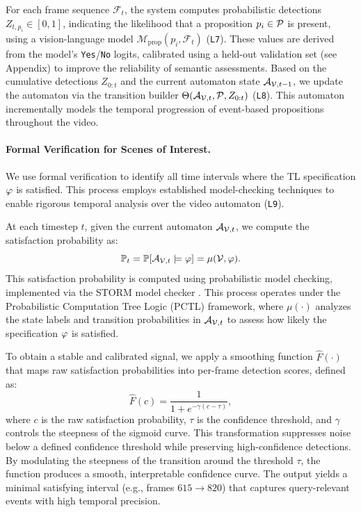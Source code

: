 \documentclass[letterpaper]{article} %
\begin{document}
    For each frame sequence $\mathcal{F}_t$, the system computes probabilistic detections $Z_{t, p_i} \in [0, 1]$, indicating the likelihood that a proposition $p_i \in \mathcal{P}$ is present, using a vision-language model $\mathcal{M}_{\text{prop}}(p_i, \mathcal{F}_t)$ (\texttt{L7}). These values are derived from the model’s \texttt{Yes}/\texttt{No} logits, calibrated using a held-out validation set (see Appendix) to improve the reliability of semantic assessments. Based on the cumulative detections $Z_{0:t}$ and the current automaton state $\mathcal{A}_{\mathcal{V},t-1}$, we update the automaton via the transition builder $\Theta(\mathcal{A}_{\mathcal{V},t}, \mathcal{P}, Z_{0:t})$ (\texttt{L8}). This automaton incrementally models the temporal progression of event-based propositions throughout the video.
    
    \paragraph{Formal Verification for Scenes of Interest.}
    We use formal verification to identify all time intervals where the TL specification $\varphi$ is satisfied. This process employs established model-checking techniques to enable rigorous temporal analysis over the video automaton (\texttt{L9}).
    
    At each timestep $t$, given the current automaton $\mathcal{A}_{\mathcal{V},t}$, we compute the satisfaction probability as:
    \begin{equation}
    \mathbb{P}_t = \mathbb{P}[\mathcal{A}_{\mathcal{V},t} \models \varphi] = \mu(\mathcal{V}, \varphi).
    \end{equation}
    This satisfaction probability is computed using probabilistic model checking, implemented via the STORM model checker \citep{storm,stormpy}. This process operates under the Probabilistic Computation Tree Logic (PCTL) framework, where $\mu(\cdot)$ analyzes the state labels and transition probabilities in $\mathcal{A}_{\mathcal{V},t}$ to assess how likely the specification $\varphi$ is satisfied.
    
    To obtain a stable and calibrated signal, we apply a smoothing function $\widehat{F}(\cdot)$ that maps raw satisfaction probabilities into per-frame detection scores, defined as:
    \begin{equation}
    \widehat{F}(c) = \frac{1}{1 + e^{-\gamma (c - \tau)}},
    \end{equation}
    where $c$ is the raw satisfaction probability, $\tau$ is the confidence threshold, and $\gamma$ controls the steepness of the sigmoid curve. This transformation suppresses noise below a defined confidence threshold while preserving high-confidence detections. By modulating the steepness of the transition around the threshold $\tau$, the function produces a smooth, interpretable confidence curve. The output yields a minimal satisfying interval (e.g., frames $615 \rightarrow 820$) that captures query-relevant events with high temporal precision. 
    
\end{document}

